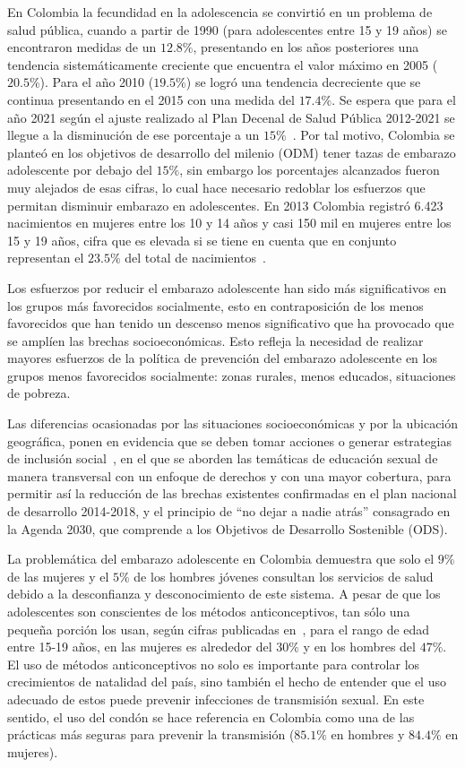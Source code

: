 \documentclass[journal,transmag]{IEEEtran}
\begin{document}
%
En Colombia la fecundidad en la adolescencia se convirtió en un problema de salud pública, cuando a partir de 1990 (para adolescentes entre 15 y 19 años) se encontraron medidas de un $12.8\%$, presentando  en los años posteriores una tendencia sistemáticamente creciente que encuentra el valor máximo en 2005 ($20.5\%$). Para el año 2010 ($19.5\%$) se logró una tendencia decreciente que se continua presentando en el 2015 con una medida del $17.4\%$. Se espera que para el año 2021 según el ajuste realizado al Plan Decenal de Salud Pública 2012-2021 se llegue a la disminución de ese porcentaje a un $15\%$~\cite{Pro2015}. Por tal motivo, Colombia se planteó en los objetivos de desarrollo del milenio (ODM) tener tazas de embarazo adolescente por debajo del $15\%$, sin embargo los porcentajes alcanzados fueron muy alejados de esas cifras, lo cual hace necesario redoblar los esfuerzos que permitan disminuir embarazo en adolescentes. En 2013 Colombia registró 6.423 nacimientos en mujeres entre los 10 y 14 años y casi 150 mil en mujeres entre los 15 y 19 años, cifra que es elevada si se tiene en cuenta que en conjunto representan el $23.5\%$ del total de nacimientos~\cite{PNUD2015}.

Los esfuerzos por reducir el embarazo adolescente han sido más significativos en los grupos más favorecidos socialmente, esto en contraposición de los menos favorecidos que han tenido un descenso menos significativo que ha provocado que se amplíen las brechas socioeconómicas. Esto refleja la  necesidad de realizar mayores esfuerzos de la política de prevención del embarazo adolescente en los grupos menos favorecidos socialmente: zonas rurales, menos educados, situaciones de pobreza. 

Las diferencias ocasionadas por las situaciones socioeconómicas y por la ubicación geográfica, ponen en evidencia que se deben tomar acciones o generar estrategias de inclusión social~\cite{BID2017}, en el que se aborden las temáticas de educación sexual de manera transversal con un enfoque de derechos y con una mayor cobertura, para permitir así la reducción de las brechas existentes confirmadas en el plan nacional de desarrollo 2014-2018, y  el  principio  de  “no  dejar  a  nadie  atrás”  consagrado  en  la  Agenda  2030,  que  comprende a los Objetivos de Desarrollo Sostenible (ODS).

La problemática del embarazo adolescente en Colombia demuestra que solo el $9\%$ de las mujeres y el $5\%$ de los hombres jóvenes consultan los servicios de salud debido a la desconfianza y desconocimiento de este sistema. A pesar de que los adolescentes son conscientes de los métodos anticonceptivos, tan sólo una pequeña porción los usan, según cifras publicadas en~\cite{Pro2015II}, para el rango de edad entre 15-19 años, en las mujeres es alrededor del $30\%$ y en los hombres del $47\%$. El uso de métodos anticonceptivos no solo es importante para controlar los crecimientos de natalidad del país, sino también el hecho de entender que el uso adecuado de estos puede prevenir infecciones de transmisión sexual. En este sentido, el uso del condón se hace referencia en Colombia como una de las prácticas más seguras para prevenir la transmisión ($85.1\%$ en hombres y $84.4\%$ en mujeres).
\end{document}
